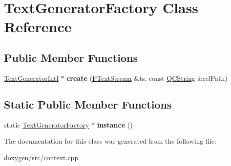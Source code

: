 \hypertarget{class_text_generator_factory}{}\section{Text\+Generator\+Factory Class Reference}
\label{class_text_generator_factory}
\subsection*{Public Member Functions}
\begin{DoxyCompactItemize}
\item 
\mbox{\label{class_text_generator_factory_a56205a024179e0cba4c3db020d9a3bd9}} 
\mbox{\hyperlink{class_text_generator_intf}{Text\+Generator\+Intf}} $\ast$ {\bfseries create} (\mbox{\hyperlink{class_f_text_stream}{F\+Text\+Stream}} \&ts, const \mbox{\hyperlink{class_q_c_string}{Q\+C\+String}} \&rel\+Path)
\end{DoxyCompactItemize}
\subsection*{Static Public Member Functions}
\begin{DoxyCompactItemize}
\item 
\mbox{\label{class_text_generator_factory_aba164e6a48efb7e16ca99327eab293f3}} 
static \mbox{\hyperlink{class_text_generator_factory}{Text\+Generator\+Factory}} $\ast$ {\bfseries instance} ()
\end{DoxyCompactItemize}


The documentation for this class was generated from the following file\+:\begin{DoxyCompactItemize}
\item 
doxygen/src/context.\+cpp\end{DoxyCompactItemize}
